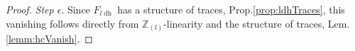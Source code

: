 \documentclass[10pt]{amsart}
\renewcommand{\implies}{\Rightarrow}
\theoremstyle{definition}
\newcommand{\zll}{\mathbb{Z}_{(l)}}
\newcommand{\ulh}{\underline{H}}
\newcommand{\fpsl}{{\operatorname{fps\!}l'}}
\newcommand{\ldh}{{l{\operatorname{dh}}}}
\newcommand{\uh}{\operatorname{uh}}
\begin{document}
\begin{proof}
\emph{Step $\epsilon$}. Since $F_\ldh$ has a structure of traces, Prop.\ref{prop:ldhTraces}, this vanishing follows directly from $\zll$-linearity and the structure of traces, Lem.\ref{lemm:hcVanish}. 
\end{proof}
%
%
%
%
%
%
%
%
%
%
%
%
%
%
%
%
%
%
%
%
%
%
%
%
\end{document}
